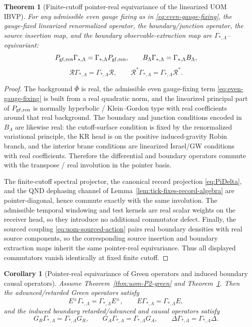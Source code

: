 \documentclass[10pt]{article}
\theoremstyle{definition}
\theoremstyle{plain}
\newtheorem{theorem}{Theorem}[section]
\newtheorem{corollary}{Corollary}[section]
\begin{document}
\begin{theorem}[Finite-cutoff pointer-real equivariance of the linearized UOM IBVP]
\label{thm:uom-pointer-real-ibvp}
For any admissible even gauge fixing as in \eqref{eq:even-gauge-fixing}, the gauge-fixed linearized renormalized operator, the
boundary/junction operator, the source insertion map, and the boundary observable-extraction map are $\Gamma_{*,\Lambda}$--equivariant:
\[
P_{\rm gf,ren}\Gamma_{*,\Lambda}=\Gamma_{*,\Lambda}P_{\rm gf,ren},
\qquad
B_\Lambda\Gamma_{*,\Lambda}=\Gamma_{*,\Lambda}B_\Lambda,
\]
\[
\mathcal R\Gamma_{*,\Lambda}=\Gamma_{*,\Lambda}\mathcal R,
\qquad
\mathcal R^\ast\Gamma_{*,\Lambda}=\Gamma_{*,\Lambda}\mathcal R^\ast.
\]
\end{theorem}

\begin{proof}
The background $\bar\Phi$ is real, the admissible even gauge-fixing term \eqref{eq:even-gauge-fixing} is built from a real quadratic norm,
and the linearized principal part of $P_{\rm gf,ren}$ is normally hyperbolic / Klein--Gordon type with real coefficients around that real
background.  The boundary and junction conditions encoded in $B_\Lambda$ are likewise real: the cutoff-surface condition is fixed by the
renormalized variational principle, the KR head is on the positive induced-gravity Robin branch, and the interior brane conditions are
linearized Israel/GW conditions with real coefficients.  Therefore the differential and boundary operators commute with the transpose / real
involution in the pointer basis.

The finite-cutoff spectral projector, the canonical record projection \eqref{eq:PiDelta}, and the QND dephasing channel of
Lemma~\ref{lem:tick-fixes-record-algebra} are pointer-diagonal, hence commute exactly with the same involution.  The admissible temporal
windowing and test kernels are real scalar weights on the receiver head, so they introduce no additional commutator defect.  Finally,
the sourced coupling \eqref{eq:uom-sourced-action} pairs real boundary densities with real source components, so the corresponding source
insertion and boundary extraction maps inherit the same pointer-real equivariance.  Thus all displayed commutators vanish identically at
fixed finite cutoff.
\end{proof}

\begin{corollary}[Pointer-real equivariance of Green operators and induced boundary causal operators]
\label{cor:uom-pointer-real-greens}
Assume Theorem~\ref{thm:uom-P2-green} and Theorem~\ref{thm:uom-pointer-real-ibvp}.  Then the advanced/retarded Green operators satisfy
\[
E^\pm\Gamma_{*,\Lambda}=\Gamma_{*,\Lambda}E^\pm,
\qquad
E\Gamma_{*,\Lambda}=\Gamma_{*,\Lambda}E,
\]
and the induced boundary retarded/advanced and causal operators satisfy
\[
G_R\Gamma_{*,\Lambda}=\Gamma_{*,\Lambda}G_R,
\qquad
G_A\Gamma_{*,\Lambda}=\Gamma_{*,\Lambda}G_A,
\qquad
\Delta\Gamma_{*,\Lambda}=\Gamma_{*,\Lambda}\Delta.
\]
\end{corollary}
\end{document}
